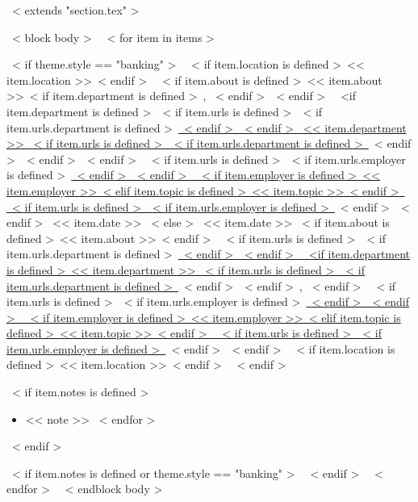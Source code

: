 ~< extends "section.tex" >~

~< block body >~
  ~< for item in items >~
    \begin{samepage}
      \cventry
        ~< if theme.style == "banking" >~
          {~< if item.location is defined >~<< item.location >>~< endif >~}
          {~< if item.about is defined >~<< item.about >>~< if item.department is defined >~, ~< endif >~~< endif >~%
	    ~<if item.department is defined >~~< if item.urls is defined >~~< if item.urls.department is defined >~\href{<< item.urls.department >>}{~< endif >~~< endif >~
	      << item.department >>
	    ~< if item.urls is defined >~~< if item.urls.department is defined >~}~< endif >~~< endif >~~< endif >~}
          {~< if item.urls is defined >~~< if item.urls.employer is defined >~\href{<< item.urls.employer >>}{~< endif >~~< endif >~%
             ~< if item.employer is defined >~<< item.employer >>~< elif item.topic is defined >~<< item.topic >>~< endif >~%
           ~< if item.urls is defined >~~< if item.urls.employer is defined >~}~< endif >~~< endif >~}
          {<< item.date >>}
        ~< else >~
          {<< item.date >>}
          {~< if item.about is defined >~<< item.about >>~< endif >~}
          {~< if item.urls is defined >~~< if item.urls.department is defined >~\href{<< item.urls.department >>}{~< endif >~~< endif >~%
             ~<if item.department is defined >~<< item.department >>%
           ~< if item.urls is defined >~~< if item.urls.department is defined >~}~< endif >~~< endif >~, ~< endif >~
           ~< if item.urls is defined >~~< if item.urls.employer is defined >~\href{<< item.urls.employer >>}{~< endif >~~< endif >~%
             ~< if item.employer is defined >~<< item.employer >>~< elif item.topic is defined >~<< item.topic >>~< endif >~%
           ~< if item.urls is defined >~~< if item.urls.employer is defined >~}~< endif >~~< endif >~}
          {~< if item.location is defined >~<< item.location >>~< endif >~}
        ~< endif >~
        {}
        {
          ~< if item.notes is defined >~
            \begin{itemize}
              ~< for note in item.notes >~
                \item{<< note >>}
              ~< endfor >~
            \end{itemize}
          ~< endif >~
        }
    \end{samepage}
    ~< if item.notes is defined or theme.style == "banking" >~
    ~< endif >~
  ~< endfor >~
~< endblock body >~
